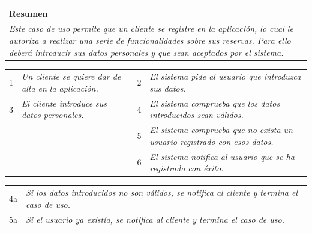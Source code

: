     \begin{table}[H]
        \begin{tabular}{llllllll}
    \hline
    \multicolumn{8}{|l|}{\cellcolor[HTML]{F2F2F2}Resumen}                                                                                                                                                                                                                                                                                                                                                                                             \\ \hline
    \multicolumn{8}{|p{15cm}|}{{\color[HTML]{808080} \textit{Este caso de uso permite que un cliente se registre en la aplicación, lo
    cual le autoriza a realizar una serie de funcionalidades sobre sus reservas. Para ello deberá introducir sus datos personales y que sean aceptados por el sistema.}}} \\ \hline
    \end{tabular}
    \end{table}

\begin{table}[h!]
    \centering
    \begin{tabular}{|p{0.6cm}|p{6.5cm}|p{0.6cm}|p{6.5cm}|}
    \rowcolor{lightgray}
    \hline
    \multicolumn{4}{|l|}{Curso Normal (Básico)} \\
    \hline
    1 & \color[HTML]{808080}\textit{Un cliente se quiere dar de alta en la aplicación.} & 2 & \color[HTML]{808080}\textit{El sistema pide al usuario que introduzca sus datos.} \\
    \hline
    3 & \color[HTML]{808080}\textit{El cliente introduce sus datos personales.} & 4 & \color[HTML]{808080}\textit{El sistema comprueba que los datos introducidos sean válidos.} \\
    \hline
    & & 5 & \color[HTML]{808080}\textit{El sistema comprueba que no exista un usuario registrado con esos datos.} \\
    \hline
    & & 6 & \color[HTML]{808080}\textit{El sistema notifica al usuario que se ha registrado con éxito.} \\
    \hline
    \end{tabular}
    \end{table}

    \begin{table}[h!]
        \centering
        \begin{tabular}{|p{0.6cm}|p{13.4cm}|}
        \rowcolor{lightgray}
        \hline
        \multicolumn{2}{|l|}{Cursos Alternos} \\
        \hline
        4a & \color[HTML]{808080}\textit{Si los datos introducidos no son válidos, se notifica al cliente y termina el caso de uso.} \\
        \hline
        5a & \color[HTML]{808080}\textit{Si el usuario ya existía, se notifica al cliente y termina el caso de uso.} \\
        \hline

        \end{tabular}
        \end{table}
        


